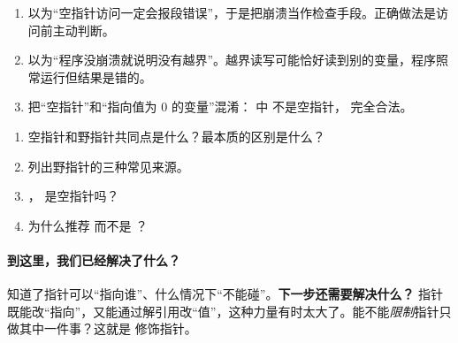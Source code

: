 \begin{warningbox}
\begin{enumerate}
  \item 以为“空指针访问一定会报段错误”，于是把崩溃当作检查手段。正确做法是访问前主动判断。
  \item 以为“程序没崩溃就说明没有越界”。越界读写可能恰好读到别的变量，程序照常运行但结果是错的。
  \item 把“空指针”和“指向值为 0 的变量”混淆： 中  不是空指针， 完全合法。
\end{enumerate}
\end{warningbox}

\begin{checkbox}
\begin{enumerate}[label=\arabic*.,itemsep=0pt]
  \item 空指针和野指针共同点是什么？最本质的区别是什么？
  \item 列出野指针的三种常见来源。
  \item {}， 是空指针吗？
  \item 为什么推荐  而不是 ？
\end{enumerate}
\end{checkbox}

\paragraph{到这里，我们已经解决了什么？} 知道了指针可以“指向谁”、什么情况下“不能碰”。\textbf{下一步还需要解决什么？} 指针既能改“指向”，又能通过解引用改“值”，这种力量有时太大了。能不能\emph{限制}指针只做其中一件事？这就是  修饰指针。
